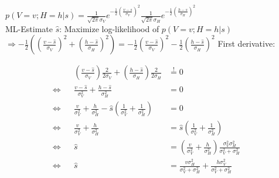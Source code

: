 \documentclass[../main/Notes.tex]{subfiles}
\begin{document}
$p\left(V=v;H=h|s\right)=\frac{1}{\sqrt{2\pi}\sigma_{V}}e^{-\frac{1}{2}\left(\frac{v-s}{\sigma_{V}}\right)^{2}}\frac{1}{\sqrt{2\pi}\sigma_{H}}e^{-\frac{1}{2}\left(\frac{h-s}{\sigma_{H}}\right)^{2}}$
\smallskip
\\
ML-Estimate $\hat{s}$: Maximize log-likelihood of $p\left(V=v;H=h|s\right)$
\smallskip
\\
$\Rightarrow -\frac{1}{2}\left(\left(\frac{v-\hat{s}}{\sigma_{V}}\right)^{2} + \left(\frac{h-\hat{s}}{\sigma_{H}}\right)^{2}\right) = -\frac{1}{2}\left(\frac{v-\hat{s}}{\sigma_{V}}\right)^{2} -\frac{1}{2} \left(\frac{h-\hat{s}}{\sigma_{H}}\right)^{2}$
\newpage
First derivative:

\begin{align*}
& & \left(\frac{v-\hat{s}}{\sigma_{V}}\right) \frac{2}{2\sigma_{V}} + \left(\frac{h-\hat{s}}{\sigma_{H}}\right) \frac{2}{2\sigma_{H}} & \stackrel{!}{=}0 & & \\
\Leftrightarrow & & \frac{v-\hat{s}}{\sigma_{V}^{2}} + \frac{h-\hat{s}}{\sigma_{H}^{2}} & = 0 & & \\
\Leftrightarrow & & \frac{v}{\sigma_{V}^{2}} + \frac{h}{\sigma_{H}^{2}} -\hat{s} \left(\frac{1}{\sigma_{V}^{2}} + \frac{1}{\sigma_{H}^{2}}\right) & = 0 & & \\
\Leftrightarrow & & \frac{v}{\sigma_{V}^{2}} + \frac{h}{\sigma_{H}^{2}} & = \hat{s} \left(\frac{1}{\sigma_{V}^{2}} + \frac{1}{\sigma_{H}^{2}}\right) & & \\
\Leftrightarrow & & \hat{s} & = \left(\frac{v}{\sigma_{V}^{2}} + \frac{h}{\sigma_{H}^{2}}\right) \frac{\sigma_{V}^{2}\sigma_{H}^{2}}{\sigma_{V}^{2} + \sigma_{H}^{2}} & & \\
\Leftrightarrow & & \hat{s} & = \frac{v\sigma_{H}^{2}}{\sigma_{V}^{2} + \sigma_{H}^{2}} + \frac{h\sigma_{V}^{2}}{\sigma_{V}^{2} + \sigma_{H}^{2}} & &
\end{align*}
\end{document}
